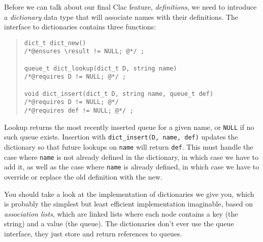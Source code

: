 \documentclass[12pt]{exam}
\begin{document}
Before we can talk about our final Clac feature, \emph{definitions},
we need to introduce a \emph{dictionary} data type that will associate
names with their definitions.
The interface to dictionaries contains three functions:
\begin{quote}
\begin{lstlisting}[numbers=none]
dict_t dict_new()
/*@ensures \result != NULL; @*/ ;

queue_t dict_lookup(dict_t D, string name)
/*@requires D != NULL; @*/ ;

void dict_insert(dict_t D, string name, queue_t def)
/*@requires D != NULL; @*/
/*@requires def != NULL; @*/ ;
\end{lstlisting}
\end{quote}
Lookup returns the most recently inserted queue for a given name, or
\lstinline'NULL' if no such queue exists.  Insertion with
\lstinline'dict_insert(D, name, def)' updates the dictionary so that
future lookups on \lstinline'name' will return \lstinline'def'. This
must handle the case where \lstinline'name' is not already defined in
the dictionary, in which case we have to add it, as well as the case
where \lstinline'name' is already defined, in which case we have to
override or replace the old definition with the new.

You should take a look at the implementation of dictionaries we give
you, which is probably the simplest but least efficient implementation
imaginable, based on \emph{association lists}, which are linked lists
where each node contains a key (the string) and a value (the
queue). The dictionaries don't ever use the queue interface, they just
store and return references to queues.
\end{document}
